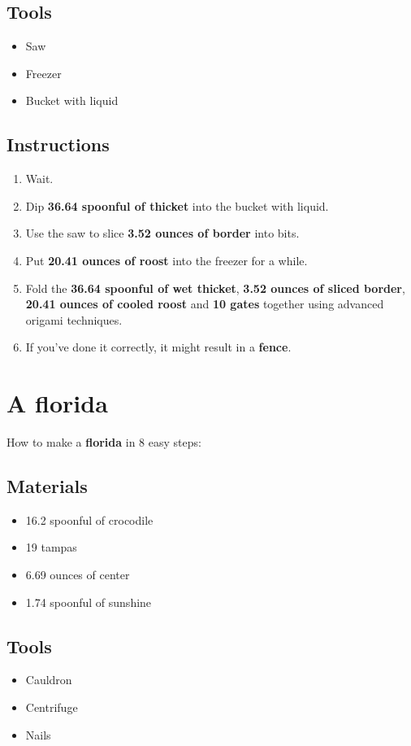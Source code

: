 \documentclass{article}
\begin{document}
\subsection{Tools}\begin{itemize}
\item 
Saw
\item 
Freezer
\item 
Bucket with liquid
\end{itemize}
\subsection{Instructions}\begin{enumerate}
\item 
Wait.
\item 
Dip \textbf{36.64 spoonful of thicket} into the bucket with liquid.
\item 
Use the saw to slice \textbf{3.52 ounces of border} into bits.
\item 
Put \textbf{20.41 ounces of roost} into the freezer for a while.
\item 
Fold the \textbf{36.64 spoonful of wet thicket}, \textbf{3.52 ounces of sliced border}, \textbf{20.41 ounces of cooled roost} and \textbf{10 gates} together using advanced origami techniques.
\item 
If you've done it correctly, it might result in a \textbf{fence}.
\end{enumerate}
\newpage
\section{A florida}How to make a \textbf{florida} in 8 easy steps:

\subsection{Materials}\begin{itemize}
\item 
16.2 spoonful of crocodile
\item 
19 tampas
\item 
6.69 ounces of center
\item 
1.74 spoonful of sunshine
\end{itemize}
\subsection{Tools}\begin{itemize}
\item 
Cauldron
\item 
Centrifuge
\item 
Nails
\end{itemize}
\end{document}
